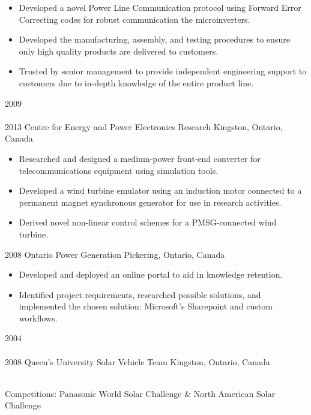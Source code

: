 \begin{entrylist}
{\begin{itemize}[leftmargin=12pt]
	\item Developed a novel Power Line Communication protocol using Forward Error Correcting codes for robust communication the microinverters.
	\item Developed the manufacturing, assembly, and testing procedures to ensure only high quality products are delivered to customers.
	\item Trusted by senior management to provide independent engineering support to customers due to in-depth knowledge of the entire product line.
\end{itemize}
}
\entry
  {2009\\\faChevronDown\\2013}
  {Centre for Energy and Power Electronics Research}
  {Kingston, Ontario, Canada}
  {
  \begin{itemize}[leftmargin=12pt]
    \item Researched and designed a medium-power front-end converter for telecommunications equipment using simulation tools.
    \item Developed a wind turbine emulator using an induction motor connected to a permanent magnet synchronous generator for use in research activities.
    \item Derived novel non-linear control schemes for a PMSG-connected wind turbine.
  \end{itemize}}
\entry
  {2008}
  {Ontario Power Generation}
  {Pickering, Ontario, Canada}
  {
  \begin{itemize}[leftmargin=12pt]
    \item Developed and deployed an online portal to aid in knowledge retention.
    \item Identified project requirements, researched possible solutions, and implemented the chosen solution: Microsoft's Sharepoint and custom workflows.
  \end{itemize}
}
\entry
  {2004\\\faChevronDown\\2008}
  {Queen's University Solar Vehicle Team}
  {Kingston, Ontario, Canada}
  {\\
  Competitions: {\bodyfontit Panasonic World Solar Challenge} \&
  {\bodyfontit North American Solar Challenge}
  \begin{itemize}[leftmargin=12pt]

\end{itemize}}
\end{entrylist}
